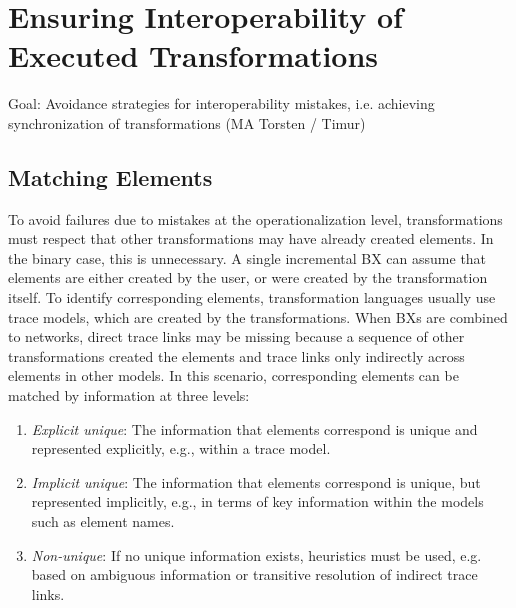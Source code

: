 \section{Ensuring Interoperability of Executed Transformations }
Goal: Avoidance strategies for interoperability mistakes, i.e. achieving synchronization of transformations (MA Torsten / Timur)
\label{chap:prevention:interoperability}

\subsection{Matching Elements}
\label{chap:prevention:interoperability:matching}

To avoid failures due to mistakes at the operationalization level, transformations must respect that other transformations may have already created elements.
In the binary case, this is unnecessary.
A single incremental \ac{BX} can assume that elements are either created by the user, %
or were created by the transformation itself.
To identify corresponding elements, transformation languages usually use trace models, which are created by the transformations.
When \acp{BX} are combined to networks, %
direct trace links may be missing because a sequence of other transformations created the elements and trace links only indirectly across elements in other models.
In this scenario, corresponding elements can be matched by information at three levels:
\begin{enumerate}
    \item \emph{Explicit unique}: The information that elements correspond is unique and represented explicitly, e.g., within a trace model. %
    \item \emph{Implicit unique}: The information that elements correspond is unique, but represented implicitly, e.g., in terms of key information within the models such as element names. %
    \item \emph{Non-unique}: If no unique information exists, heuristics must be used, e.g. based on ambiguous information or transitive resolution of indirect trace links.
\end{enumerate}

